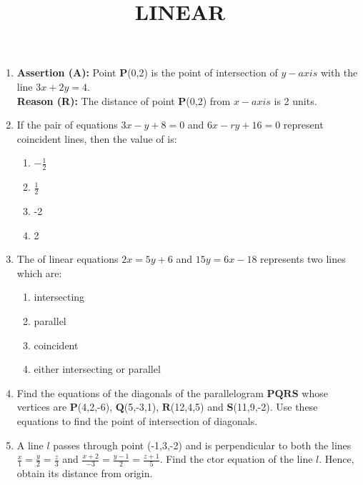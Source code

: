 \documentclass{article}
\let\vec\mathbf
\begin{document}
\title{\textbf{LINEAR}}
\date{}
\maketitle
\begin{enumerate}

	\item \textbf{Assertion (A):} Point $\vec{P}$(0,2) is the point of intersection of $y-axis$ with  the line $3x+2y=4$.\\
		\textbf{Reason (R):} The distance of point $\vec{P}$(0,2) from $x-axis$ is 2 units.


	\item If the pair of equations $3x-y+8=0$ and $6x-ry+16=0$ represent coincident lines, then the value of  is:

		\begin{enumerate}
			\item $-\frac{1}{2}$
			\item $\frac{1}{2}$
			\item -2
			\item 2
		\end{enumerate}

	\item The of linear equations $2x=5y+6$ and $15y=6x-18$ represents two lines which are:

			\begin{enumerate}
				\item intersecting
				\item parallel
				\item coincident
				\item either intersecting or parallel
			\end{enumerate}

		\item Find the equations of the diagonals of the parallelogram $\vec{PQRS}$ whose vertices are $\vec{P}$(4,2,-6), $\vec{Q}$(5,-3,1), $\vec{R}$(12,4,5) and $\vec{S}$(11,9,-2). Use these equations to find the point of intersection of diagonals.

	\item A line $l$ passes through point (-1,3,-2) and is perpendicular to both the lines $\frac {x}{1}=\frac{y}{2}=\frac{z}{3}$ and $\frac {x+2}{-3}=\frac{y-1}{2}=\frac{z+1}{5}$. Find the ctor equation of the line $l$. Hence, obtain its distance from origin.

\end{enumerate}
\end{document}
